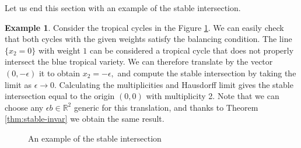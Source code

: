 \documentclass[11pt]{amsart}
\theoremstyle{definition}
\newtheorem{example}[theorem]{Example}
\newcommand{\R}{\mathbb{R}}
\begin{document}
Let us end this section with an example of the stable intersection. 
\begin{example}\label{eg:stable-int}
Consider the tropical cycles in the Figure \ref{fig:stable-int}. We can easily check that both cycles with the given weights satisfy the balancing condition. The line $\{ x_2=0\}$ with weight $1$ can be considered a tropical cycle that does not properly intersect the blue tropical variety. We can therefore translate by the vector $(0, -\epsilon )$ it to obtain $x_2= -\epsilon,$ and compute the stable intersection by taking the limit as $\epsilon \to 0.$ Calculating the multiplicities and Hausdorff limit gives the stable intersection equal to the origin $(0,0)$ with multiplicity 2. Note that we can choose any $\epsilon b \in \R^2$ generic for this translation, and thanks to Theorem \ref{thm:stable-invar} we obtain the same result.
\begin{figure}
   
\begin{center}
\end{center}

    \caption{An example of the stable intersection}
    \label{fig:stable-int}

\end{figure}
\end{example}
\end{document}
